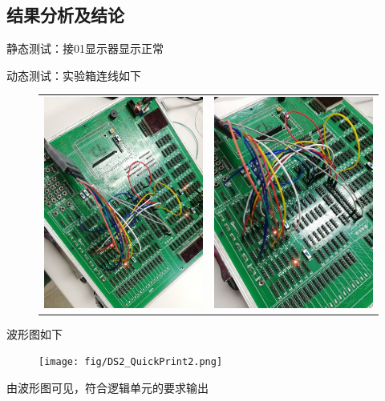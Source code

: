 \documentclass[11pt,UTF8]{ctexart}
\begin{document}
\subsection{结果分析及结论}
\par 静态测试：接01显示器显示正常
\par 动态测试：实验箱连线如下
\begin{figure}[H]
    \centering
    \begin{tabular}{cc}
    \includegraphics[width=0.4\linewidth]{fig/p2.jpg}&
    \includegraphics[width=0.4\linewidth]{fig/p2-1.jpg}
    \end{tabular}
\end{figure}
\par 波形图如下
\begin{figure}[H]
    \centering
    \texttt{[image: fig/DS2\_QuickPrint2.png]}
\end{figure}
\par 由波形图可见，符合逻辑单元的要求输出
\end{document}
